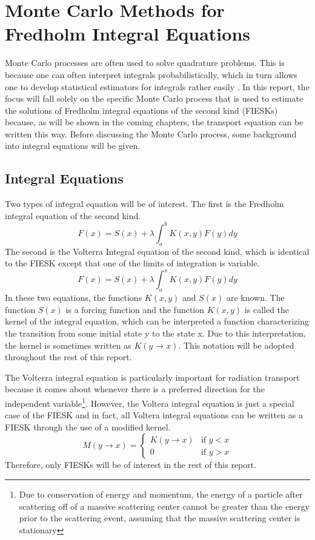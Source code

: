 \chapter{Monte Carlo Methods for Fredholm Integral Equations}
\label{ch:mc_methods}
Monte Carlo processes are often used to solve quadrature problems. This is 
because one can often interpret integrals probabilistically, which in turn 
allows one to develop statistical estimators for integrals rather easily 
\citep{spanier_monte_1969}. In this report, the focus will fall solely on the 
specific Monte Carlo process that is used to estimate the solutions of Fredholm 
integral equations of the second kind (FIESKs) because, as will be shown in the 
coming chapters, the transport equation can be written this way. Before 
discussing the Monte Carlo process, some background into integral equations 
will be given. 

\section{Integral Equations}
\label{sec:integral_equations}
Two types of integral equation will be of interest. The first is the Fredholm 
integral equation of the second kind.
\begin{equation}
  F(x) = S(x) + \lambda \int_a^b K(x,y) F(y)dy
  \label{eq:fredholm_int_eqn}
\end{equation}
The second is the Volterra Integral equation of the second kind, which is 
identical to the FIESK except that one of the limits of integration is variable.
\begin{equation}
  F(x) = S(x) + \lambda \int_a^x K(x,y) F(y) dy
  \label{eq:volterra_int_eqn}
\end{equation}
In these two equations, the functions $K(x,y)$ and $S(x)$ are known. The 
function $S(x)$ is a forcing function and the function $K(x,y)$ is called the 
kernel of the integral equation, which can be interpreted a function 
characterizing the transition from some initial state y to the state x. Due to 
this interpretation, the kernel is sometimes written as $K(y \to x)$. This 
notation will be adopted throughout the rest of this report.

The Volterra integral equation is particularly important for radiation 
transport because it comes about whenever there is a preferred direction for the
independent variable\footnote{Due to conservation of energy and momentum, 
the energy of a particle after scattering off of a massive scattering center 
cannot be greater than the energy prior to the scattering event, assuming that 
the massive scattering center is stationary}. However, the Voltera integral 
equation is just a special case of the FIESK and in fact, all Voltera integral
equations can be written as a FIESK through the use of a modified kernel. 
\begin{equation}
  M(y \to x) = 
  \begin{cases}
    K(y \to x) & \text{if }y < x \\
    0 & \text{if }y > x 
  \end{cases}
\end{equation}
Therefore, only FIESKs will be of interest in the rest of this report.

